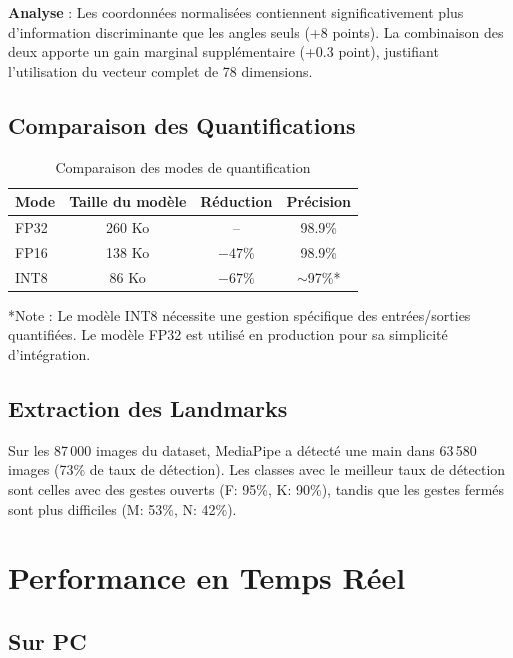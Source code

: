 \textbf{Analyse} : Les coordonnées normalisées contiennent significativement plus d'information discriminante que les angles seuls (+8 points). La combinaison des deux apporte un gain marginal supplémentaire (+0.3 point), justifiant l'utilisation du vecteur complet de 78 dimensions.

\subsection{Comparaison des Quantifications}

\begin{table}[H]
    \centering
    \begin{tabular}{lccc}
        \toprule
        \textbf{Mode} & \textbf{Taille du modèle} & \textbf{Réduction} & \textbf{Précision} \\
        \midrule
        FP32 & 260 Ko & -- & 98.9\% \\
        FP16 & 138 Ko & $-47\%$ & 98.9\% \\
        INT8 & 86 Ko & $-67\%$ & $\sim$97\%* \\
        \bottomrule
    \end{tabular}
    \caption{Comparaison des modes de quantification}
    \label{tab:quant}
\end{table}

\small{*Note : Le modèle INT8 nécessite une gestion spécifique des entrées/sorties quantifiées. Le modèle FP32 est utilisé en production pour sa simplicité d'intégration.}

\subsection{Extraction des Landmarks}

Sur les 87\,000 images du dataset, MediaPipe a détecté une main dans 63\,580 images (73\% de taux de détection). Les classes avec le meilleur taux de détection sont celles avec des gestes ouverts (F: 95\%, K: 90\%), tandis que les gestes fermés sont plus difficiles (M: 53\%, N: 42\%).

\section{Performance en Temps Réel}

\subsection{Sur PC}

